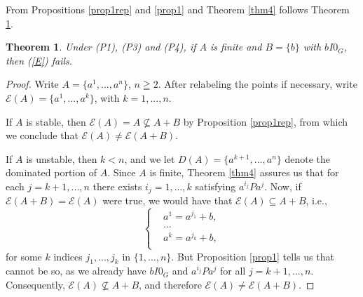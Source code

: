 \documentclass[pdflatex,sn-apa,11pt]{sn-jnl}%
\newtheorem{theorem}{Theorem}%
\newtheorem{remark}{Remark}%
\begin{document}

From Propositions \ref{prop1rep} and \ref{prop1} and Theorem \ref{thm4} follows Theorem \ref{thm5}.

\begin{theorem}
\label{thm5}
Under (P1), (P3) and (P4), if $A$ is finite and $B = \{b\}$ with $bI0_G$, then (\ref{E}) fails.
\end{theorem}

\begin{proof}
    Write $A = \{a^1, ..., a^n\}$, $n \geqq 2$. After relabeling the points if necessary, write $\mathscr{E}(A) = \{a^1, ..., a^k\}$, with $k = 1, ..., n$. 
    
    If $A$ is stable, then $\mathscr{E}(A) = A \not\subseteq A+B$ by Proposition \ref{prop1rep}, from which we conclude that $\mathscr{E}(A) \neq \mathscr{E}(A+B)$. 
    
    If $A$ is unstable, then $k < n$, and we let $D(A) = \{a^{k+1}, ..., a^{n}\}$ denote the dominated portion of $A$. Since $A$ is finite, Theorem \ref{thm4} assures us that for each $j = k+1, ..., n$ there exists $i_j = 1, ..., k$ satisfying $a^{i_j}Pa^{j}$. Now, if $\mathscr{E}(A+B) = \mathscr{E}(A)$ were true, we would have that $\mathscr{E}(A) \subseteq A+B$, i.e.,
    \begin{equation*}
  \left\{
    \begin{aligned}
      & a^1 = a^{j_1} + b, \\
      & \dots \\
      & a^k = a^{j_k} + b, \\
    \end{aligned}
  \right.
\end{equation*}
for some $k$ indices $j_1, ..., j_k$ in $\{1, ..., n\}$. But Proposition \ref{prop1} tells us that cannot be so, as we already have $bI0_G$ and $a^{i_j}Pa^{j}$ for all $j = k+1, ..., n$. Consequently, $\mathscr{E}(A) \not \subseteq A+B$, and therefore $\mathscr{E}(A) \neq \mathscr{E}(A+B)$.
\end{proof}
\end{document}
